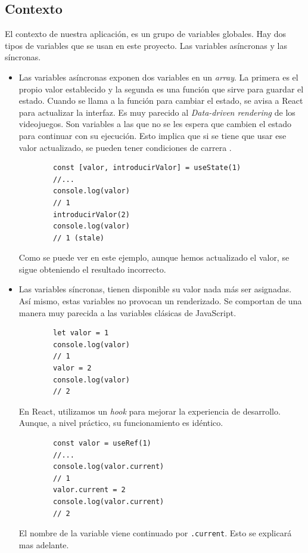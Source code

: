 \subsection{Contexto}
El contexto de nuestra aplicación, es un grupo de variables globales. Hay dos tipos de variables que se usan en este proyecto.
Las variables asíncronas y las síncronas.
\begin{itemize}
    \item Las variables asíncronas exponen dos variables en un \textit{array}. La primera es el propio valor establecido y la segunda es una función que sirve para guardar el estado. Cuando se llama a la función para cambiar el estado, se avisa a React para actualizar la interfaz. Es muy parecido al \textit{Data-driven rendering} \cite{web:ddr} de los videojuegos. Son variables a las que no se les espera que cambien el estado para continuar con su ejecución. Esto implica que si se tiene que usar ese valor actualizado, se pueden tener condiciones de carrera \cite{web:race}.
    \begin{lstlisting}
        const [valor, introducirValor] = useState(1)
        //...
        console.log(valor)
        // 1
        introducirValor(2)
        console.log(valor)
        // 1 (stale)
    \end{lstlisting}
    Como se puede ver en este ejemplo, aunque hemos actualizado el valor, se sigue obteniendo el resultado incorrecto.
    \item Las variables síncronas, tienen disponible su valor nada más ser asignadas. Así mismo, estas variables no provocan un renderizado. Se comportan de una manera muy parecida a las variables clásicas de JavaScript.
    \begin{lstlisting}
        let valor = 1
        console.log(valor)
        // 1
        valor = 2
        console.log(valor)
        // 2
    \end{lstlisting}
    En React, utilizamos un \textit{hook} para mejorar la experiencia de desarrollo. Aunque, a nivel práctico, su funcionamiento es idéntico.
    \begin{lstlisting}
        const valor = useRef(1)
        //...
        console.log(valor.current)
        // 1
        valor.current = 2
        console.log(valor.current)
        // 2
    \end{lstlisting}
    El nombre de la variable viene continuado por \verb|.current|. Esto se explicará mas adelante.
\end{itemize}
